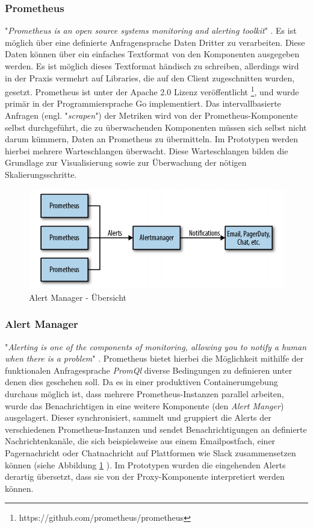 \subsubsection{Prometheus}
\label{ss:prometheus}
"\emph{Prometheus is an open source systems monitoring and alerting toolkit}" \cite[Seite~400]{oreillyPrometheus}. Es ist möglich über eine definierte Anfragensprache Daten Dritter zu verarbeiten. Diese Daten können über ein einfaches Textformat von den Komponenten ausgegeben werden. Es ist möglich dieses Textformat händisch zu schreiben, allerdings wird in der Praxis vermehrt auf Libraries, die auf den Client zugeschnitten wurden, gesetzt. Prometheus ist unter der Apache 2.0 Lizenz veröffentlicht \footnote{https://github.com/prometheus/prometheus}, und wurde primär in der Programmiersprache Go implementiert. Das intervallbasierte Anfragen (engl. "\emph{scrapen}") der Metriken wird von der Prometheus-Komponente selbst durchgeführt, die zu überwachenden Komponenten müssen sich selbst nicht darum kümmern, Daten an Prometheus zu übermitteln. Im Prototypen werden hierbei mehrere Warteschlangen überwacht. Diese Warteschlangen bilden die Grundlage zur Visualisierung sowie zur Überwachung der nötigen Skalierungsschritte.


\begin{figure}[ht!]
	\centering
	\includegraphics[width=.8\linewidth]{kapitel/problemloesung/implementierung/_img/alert-man-p291}
	\caption[Alert Manager - Übersicht]{Alert Manager - Übersicht \cite[Seite~291]{oreillyPrometheus}}
	\label{fig:alertManOverview}
\end{figure}

\subsubsection{Alert Manager}
"\emph{Alerting is one of the components of monitoring, allowing you to notify a human when there is a problem}" \cite[Seite~291]{oreillyPrometheus}. Prometheus bietet hierbei die Möglichkeit mithilfe der funktionalen Anfragesprache \emph{PromQl} diverse Bedingungen zu definieren unter denen dies geschehen soll. Da es in einer produktiven Containerumgebung durchaus möglich ist, dass mehrere Prometheus-Instanzen parallel arbeiten, wurde das Benachrichtigen in eine weitere Komponente (den \emph{Alert Manger}) ausgelagert. Dieser synchronisiert, sammelt und gruppiert die Alerts der verschiedenen Prometheus-Instanzen und sendet Benachrichtigungen an definierte Nachrichtenkanäle, die sich beispielsweise aus einem Emailpostfach, einer Pagernachricht oder Chatnachricht auf Plattformen wie Slack zusammensetzen können (siehe Abbildung \ref{fig:alertManOverview} ). Im Prototypen wurden die eingehenden Alerts derartig übersetzt, dass sie von der Proxy-Komponente interpretiert werden können.


